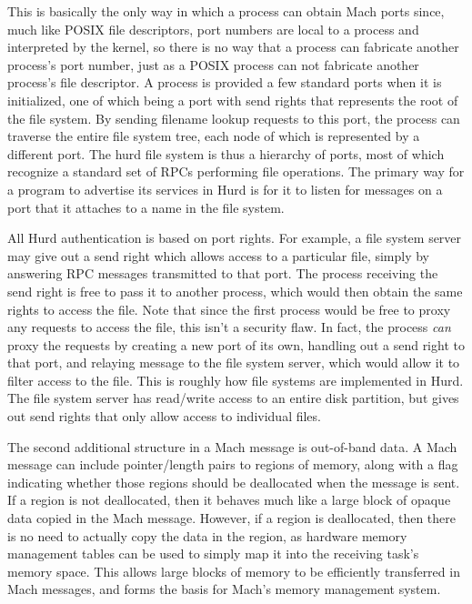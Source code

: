 \documentclass{article}
\begin{document}
This is basically the only way in which a process can obtain Mach
ports since, much like POSIX file descriptors, port numbers are local
to a process and interpreted by the kernel, so there is no way that a
process can fabricate another process's port number, just as a POSIX
process can not fabricate another process's file descriptor.  A
process is provided a few standard ports when it is initialized, one
of which being a port with send rights that represents the root of the
file system.  By sending filename lookup requests to this port, the
process can traverse the entire file system tree, each node of which
is represented by a different port.  The hurd file system is thus a
hierarchy of ports, most of which recognize a standard set of RPCs
performing file operations.  The primary way for a program to
advertise its services in Hurd is for it to listen for messages on a
port that it attaches to a name in the file system.

All Hurd authentication is based on port rights.  For example, a file
system server may give out a send right which allows access to a
particular file, simply by answering RPC messages transmitted to that
port.  The process receiving the send right is free to pass it to
another process, which would then obtain the same rights to access the
file.  Note that since the first process would be free to proxy any
requests to access the file, this isn't a security flaw.  In fact, the
process {\it can} proxy the requests by creating a new port of its
own, handling out a send right to that port, and relaying message to
the file system server, which would allow it to filter access to the
file.  This is roughly how file systems are implemented in Hurd.  The
file system server has read/write access to an entire disk partition,
but gives out send rights that only allow access to individual files.

The second additional structure in a Mach message is out-of-band data.
A Mach message can include pointer/length pairs to regions of memory,
along with a flag indicating whether those regions should be
deallocated when the message is sent.  If a region is not deallocated,
then it behaves much like a large block of opaque data copied in the
Mach message.  However, if a region is deallocated, then there is no
need to actually copy the data in the region, as hardware memory
management tables can be used to simply map it into the receiving
task's memory space.  This allows large blocks of memory to be
efficiently transferred in Mach messages, and forms the basis for
Mach's memory management system.
\end{document}
